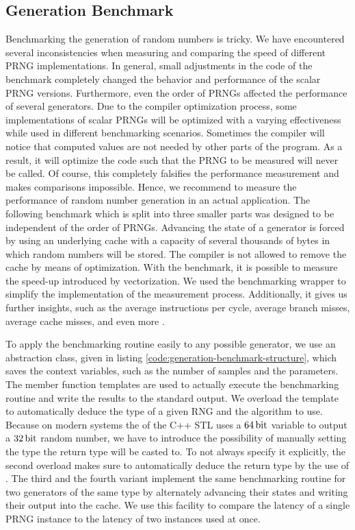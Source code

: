 \documentclass{stdlocal}
\begin{document}
  \subsection{Generation Benchmark} %
  \label{sub:generation_benchmark}
    Benchmarking the generation of random numbers is tricky.
    We have encountered several inconsistencies when measuring and comparing the speed of different PRNG implementations.
    In general, small adjustments in the code of the benchmark completely changed the behavior and performance of the scalar PRNG versions.
    Furthermore, even the order of PRNGs affected the performance of several generators.
    Due to the compiler optimization process, some implementations of scalar PRNGs will be optimized with a varying effectiveness while used in different benchmarking scenarios.
    Sometimes the compiler will notice that computed values are not needed by other parts of the program.
    As a result, it will optimize the code such that the PRNG to be measured will never be called.
    Of course, this completely falsifies the performance measurement and makes comparisons impossible.
    Hence, we recommend to measure the performance of random number generation in an actual application.
    The following benchmark which is split into three smaller parts was designed to be independent of the order of PRNGs.
    Advancing the state of a generator is forced by using an underlying cache with a capacity of several thousands of bytes in which random numbers will be stored.
    The compiler is not allowed to remove the cache by means of optimization.
    With the benchmark, it is possible to measure the speed-up introduced by vectorization.
    We used the  benchmarking wrapper to simplify the implementation of the measurement process.
    Additionally, it gives us further insights, such as the average instructions per cycle, average branch misses, average cache misses, and even more \autocite{perfevent}.

    To apply the benchmarking routine easily to any possible generator, we use an abstraction class, given in listing \ref{code:generation-benchmark-structure}, which saves the context variables, such as the number of samples and the  parameters.
    The member function templates  are used to actually execute the benchmarking routine and write the results to the standard output.
    We overload the template to automatically deduce the type of a given RNG and the algorithm to use.
    Because on modern systems the  of the C++ STL uses a $64\, \mathrm{bit}$ variable to output a $32\, \mathrm{bit}$ random number, we have to introduce the possibility of manually setting the type the return type will be casted to.
    To not always specify it explicitly, the second overload makes sure to automatically deduce the return type by the use of .
    The third and the fourth variant implement the same benchmarking routine for two generators of the same type by alternately advancing their states and writing their output into the cache.
    We use this facility to compare the latency of a single PRNG instance to the latency of two instances used at once.
\end{document}
